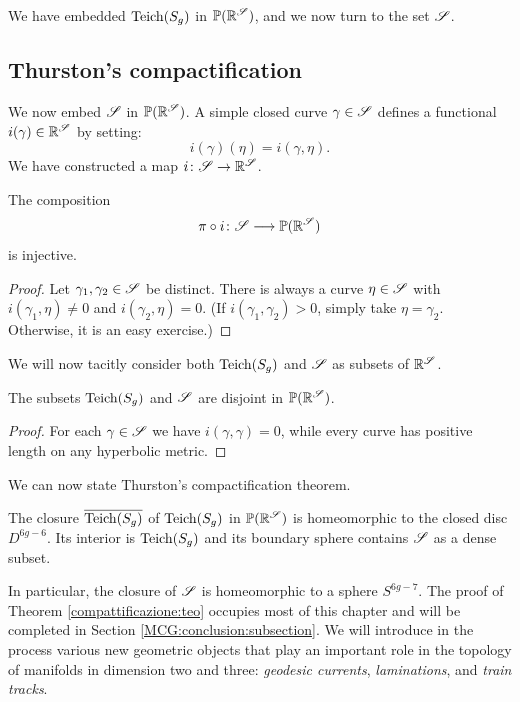 We have embedded ${\rm Teich}(S_g)$ in $\mathbb{P}(\mathbb{R}^\mathscr{S})$, and we now turn to the set $\mathscr{S}$.

\subsection{Thurston's compactification}
We now embed $\mathscr{S}$ in $\mathbb{P}(\mathbb{R}^\mathscr{S})$. A simple closed curve $\gamma \in \mathscr{S}$ defines a functional $i(\gamma) \in \mathbb{R}^\mathscr{S}$ by setting:
$$i(\gamma)(\eta) = i(\gamma, \eta).$$
We have constructed a map $i\colon \mathscr{S} \to \mathbb{R}^\mathscr{S}$.
\begin{prop}
The composition
$$\pi \circ i\colon\mathscr{S} \longrightarrow \mathbb{P}(\mathbb{R}^\mathscr{S})$$
is injective.
\end{prop}
\begin{proof}
Let $\gamma_1, \gamma_2\in \mathscr{S}$ be distinct. There is always a curve $\eta\in\mathscr{S}$ with $i(\gamma_1,\eta)\neq 0$ and $i(\gamma_2,\eta)=0$. (If $i(\gamma_1,\gamma_2)>0$, simply take $\eta=\gamma_2$. Otherwise, it is an easy exercise.)
\end{proof}

We will now tacitly consider both ${\rm Teich}(S_g)$ and $\mathscr{S}$ as subsets of $\mathbb{R}^\mathscr{S}$.
\begin{prop}
The subsets ${\rm Teich}(S_g)$ and $\mathscr{S}$ are disjoint in $\mathbb{P}(\mathbb{R}^\mathscr{S})$.
\end{prop}
\begin{proof}
For each $\gamma\in\mathscr{S}$ we have $i(\gamma,\gamma)=0$, while every curve has positive length on any hyperbolic metric.
\end{proof}

We can now state Thurston's compactification theorem. 

\begin{teo} \label{compattificazione:teo}
The closure $\overline{{\rm Teich}(S_g)}$ of ${\rm Teich}(S_g)$ in $\mathbb{P}(\mathbb{R}^\mathscr{S})$ is homeomorphic to the closed disc $D^{6g-6}$. Its interior is ${\rm Teich}(S_g)$ and its boundary sphere contains $\mathscr{S}$ as a dense subset.
\end{teo}
In particular, the closure of $\mathscr{S}$ is homeomorphic to a sphere $S^{6g-7}$. 
The proof of Theorem \ref{compattificazione:teo} occupies most of this chapter and will be completed in Section \ref{MCG:conclusion:subsection}. We will introduce in the process various new geometric objects that play an important role in the topology of manifolds in dimension two and three: \emph{geodesic currents}, \emph{laminations}, and \emph{train tracks}.

